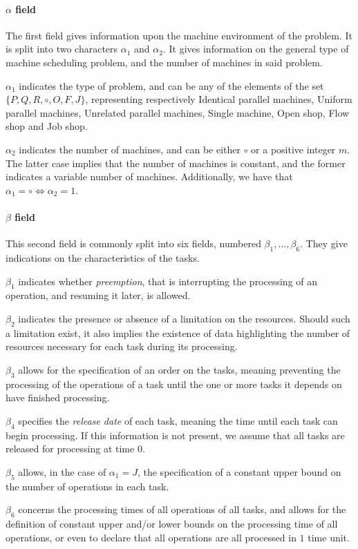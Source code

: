 \documentclass{mimosis}
\begin{document}
\paragraph{\(\alpha\) field}
The first field gives information upon the machine environment of the problem. It is split into two characters \(\alpha_1\) and \(\alpha_2\). It gives information on the general type of machine scheduling problem, and the number of machines in said problem.

\begin{description}
\item \(\alpha_1\) indicates the type of problem, and can be any of the elements of the set \(\{P,Q,R,\circ,O,F,J\}\), representing respectively Identical parallel machines, Uniform parallel machines, Unrelated parallel machines, Single machine, Open shop, Flow shop and Job shop.
\item \(\alpha_2\) indicates the number of machines, and can be either \(\circ\) or a positive integer \(m\). The latter case implies that the number of machines is constant, and the former indicates a variable number of machines. Additionally, we have that \(\alpha_1 = \circ \iff \alpha_2 = 1\).
\end{description}

\paragraph{\(\beta\) field}
This second field is commonly split into six fields, numbered \(\beta_1,...,\beta_6\). They give indications on the characteristics of the tasks.

\begin{description}
\item \(\beta_1\) indicates whether \emph{preemption}, that is interrupting the processing of an operation, and resuming it later, is allowed.
\item \(\beta_2\) indicates the presence or absence of a limitation on the resources. Should such a limitation exist, it also implies the existence of data highlighting the number of resources necessary for each task during its processing.
\item \(\beta_3\) allows for the specification of an order on the tasks, meaning preventing the processing of the operations of a task until the one or more tasks it depends on have finished processing.
\item \(\beta_4\) specifies the \emph{release date} of each task, meaning the time until each task can begin processing. If this information is not present, we assume that all tasks are released for processing at time \(0\).
\item \(\beta_5\) allows, in the case of \(\alpha_1 = J\), the specification of a constant upper bound on the number of operations in each task.
\item \(\beta_6\) concerns the processing times of all operations of all tasks, and allows for the definition of constant upper and/or lower bounds on the processing time of all operations, or even to declare that all operations are all processed in \(1\) time unit. 
\end{description} 
\end{document}
